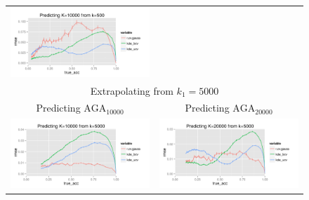 \documentclass[twoside,11pt]{article}
\newenvironment{myfont}{\fontfamily{phv}\selectfont}{\par}
\begin{document}
\begin{figure}
\begin{tabular}{cc}
\includegraphics[scale = 0.55, clip = true, trim = 0 0 0 0in]{sim_large7_K10_k0_5.png}\\ 
\multicolumn{2}{c}{\begin{myfont}Extrapolating from $k_1 = 5000$\end{myfont}}\\
\begin{myfont}Predicting $\text{AGA}_{10000}$\end{myfont} &
\begin{myfont}Predicting $\text{AGA}_{20000}$\end{myfont}\\
\includegraphics[scale = 0.55, clip = true, trim = 0 0 0 0in]{sim_large7_K10_k5.png} &
\includegraphics[scale = 0.55, clip = true, trim = 0 0 0 0in]{sim_large7_K20_k5.png}\\

\end{tabular}
\end{figure}
\end{document}
